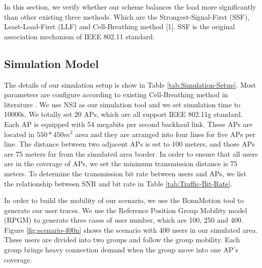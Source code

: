 In this section, we verify whether our scheme balances the load more significantly than other existing three methods. Which are the Strongest-Signal-First (SSF), Least-Load-First (LLF) and Cell-Breathing method [1]. SSF is the original association mechanism of IEEE 802.11 standard.

\subsection{Simulation Model}
The details of our simulation setup is show in Table \ref{tab:Simulation-Setup}. Most parameters are configure according to existing Cell-Breathing method in literature \cite{bejerano2009cell}. We use NS3 as our simulation tool and we set simulation time to 10000s. We totally set 20 APs, which are all support IEEE 802.11g standard. Each AP is equipped with 54 megabits per second backhaul link. These APs are located in $550 * 450 m^2$ area and they are arranged into four lines for five APs per line. The distance between two adjacent APs is set to 100 meters, and those APs are 75 meters far from the simulated area border. In order to ensure that all users are in the coverage of APs, we set the minimum transmission distance is 75 meters. To determine the transmission bit rate between users and APs, we list the relationship between SNR and bit rate in Table \ref{tab:Traffic-Bit-Rate}.

In order to build the mobility of our scenario, we use the BonnMotion tool to generate our user traces. We use the Reference Position Group Mobility model (RPGM) to generate three cases of user number, which are 100, 250 and 400. Figure \ref{fig:scenario-400n} shows the scenario with 400 users in our simulated area. These users are divided into two groups and follow the group mobility. Each group brings heavy connection demand when the group move into one AP’s coverage.

